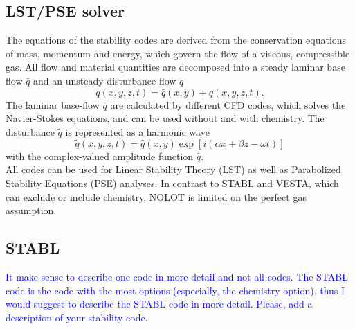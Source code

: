 \documentclass[]{aiaa-tc}%
\begin{document}
\subsection{LST/PSE solver}
The equations of the stability codes are derived from the conservation equations of mass, momentum and energy, which govern the flow of a viscous, compressible gas. All flow and material quantities are decomposed into a steady laminar base flow $\bar{q}$ and an unsteady 
disturbance flow $\tilde{q}$\
\begin{equation}
q(x,y,z,t)=\bar{q}(x,y)+\tilde{q}(x,y,z,t).
\end{equation}
The  laminar base-flow $\bar{q}$ are calculated by different CFD codes, which solves the Navier-Stokes equations, and can be used without and with chemistry. The disturbance $\tilde{q}$ is represented as a harmonic wave
\begin{equation}
\tilde{q}(x,y,z,t)=\hat{q}(x,y)\exp[i(\alpha x + \beta z - \omega t)]\label{wave}
\end{equation}
with the complex-valued amplitude function $\hat{q}$. \\

All codes can be used for Linear Stability Theory (LST) as well as Parabolized Stability Equations (PSE) analyses. In contrast to STABL and VESTA, which can exclude or include chemistry, NOLOT is limited on the perfect gas assumption.  

\subsection{STABL}
\textcolor{blue}{It make sense to describe one code in more detail and not all codes. The STABL code is the code with the most options (especially, the chemistry option), thus I would suggest to describe the STABL code in more detail. Please, add a description of your stability code.}
\end{document}
